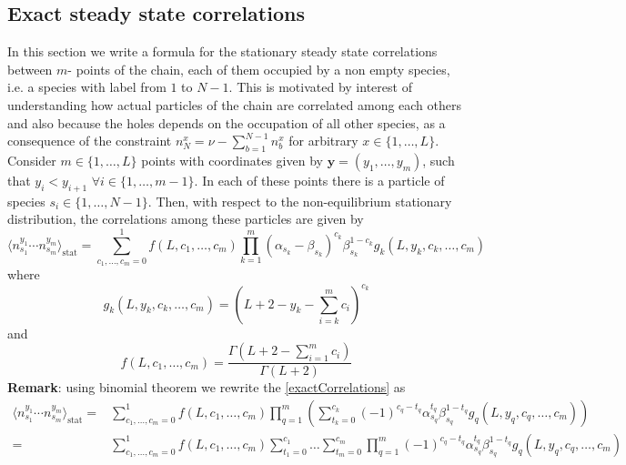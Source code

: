 \documentclass[10pt]{article}
\numberwithin{equation}{section}
\numberwithin{equation}{subsection}
\begin{document}
\subsection{Exact steady state correlations}\label{correlation-section}
In this section we write a formula for the stationary steady state correlations between $m$- points of the chain, each of them occupied by a non empty species, i.e. a species with label from $1$ to $N-1$. This is motivated by interest of understanding how actual particles of the chain are correlated among each others and also because the holes depends on the occupation of all other species, as a consequence of the constraint $n_{N}^{x}=\nu-\sum_{b=1}^{N-1}n_{b}^{x}$ for arbitrary $x\in \{1,\ldots,L\}$. Consider $m\in \{1,\ldots,L\}$ points with coordinates given by $\bm{y}=(y_{1},\ldots,y_{m})$, such that $y_{i}<y_{i+1}$ $\forall i\in \{1,\ldots,m-1\}$. In each of these points there is a particle of species $s_{i}\in \{1,\ldots,N-1\}$. Then, with respect to the non-equilibrium stationary distribution, the correlations among these particles are given by
\begin{equation}\label{exactCorrelations}
		\langle n^{y_{1}}_{s_{1}}\cdots n^{y_{m}}_{s_{m}}\rangle_{\text{stat}}=\sum_{c_{1},\ldots,c_{m}=0}^{1}
			f(L,c_{1},\ldots,c_{m})\prod_{k=1}^{m}(\alpha_{s_{k}}-\beta_{s_{k}})^{c_{k}}\beta_{s_{k}}^{1-c_{k}}g_{k}(L,y_{k},c_{k},\ldots,c_{m})
	\end{equation}
	where 
	\begin{equation}\label{powerCoeffSpecies}
		g_{k}(L,y_{k},c_{k},\ldots,c_{m})=\left(L+2-y_{k}-\sum_{i=k}^{m}c_{i}\right)^{c_{k}}
	\end{equation}
	and 
	\begin{equation}\label{powerCoeffNOspec}
		f(L,c_{1},\ldots,c_{m})=\frac{\Gamma(L+2-\sum_{i=1}^{m}c_{i})}{\Gamma(L+2)}
	\end{equation}
\textbf{Remark}: using binomial theorem we rewrite the \eqref{exactCorrelations} as 
\begin{equation}
\begin{split}
\langle n^{y_{1}}_{s_{1}}\cdots n^{y_{m}}_{s_{m}}\rangle_{\text{stat}}=&
\sum_{c_{1},\ldots,c_{m}=0}^{1}
f(L,c_{1},\ldots,c_{m})\prod_{q=1}^{m}\left(\sum_{t_{k}=0}^{c_{k}}(-1)^{c_{q}-t_{q}}\alpha_{s_{q}}^{t_{q}}\beta_{s_{q}}^{1-t_{q}}g_{q}(L,y_{q},c_{q},\ldots,c_{m})\right)\\
=&\sum_{c_{1},\ldots,c_{m}=0}^{1}
f(L,c_{1},\ldots,c_{m})\sum_{t_{1}=0}^{c_{1}}\ldots\sum_{t_{m}=0}^{c_{m}}\prod_{q=1}^{m}(-1)^{c_{q}-t_{q}}\alpha_{s_{q}}^{t_{q}}\beta_{s_{q}}^{1-t_{q}}g_{q}(L,y_{q},c_{q},\ldots,c_{m})
\end{split}
\end{equation}
\end{document}
